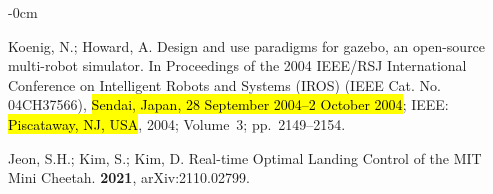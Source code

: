 \documentclass[sensors,article,accept,pdftex,moreauthors]{Definitions/mdpi}
\begin{document}
\begin{adjustwidth}{-\extralength}{0cm}
\begin{thebibliography}{999}
Koenig, N.; Howard, A.
\newblock Design and use paradigms for gazebo, an open-source multi-robot
  simulator.
\newblock In Proceedings of the 2004 IEEE/RSJ International Conference on
  Intelligent Robots and Systems (IROS) (IEEE Cat. No. 04CH37566), \hl{Sendai, Japan, 28 September 2004--2 October 2004}; IEEE: \hl{Piscataway, NJ, USA},  2004;
  Volume~3; pp.~2149--2154.

Jeon, S.H.; Kim, S.; Kim, D.
\newblock Real-time Optimal Landing Control of the MIT Mini Cheetah.
 {\bf 2021},  arXiv:2110.02799.

\end{thebibliography}




\end{adjustwidth}
\end{document}
